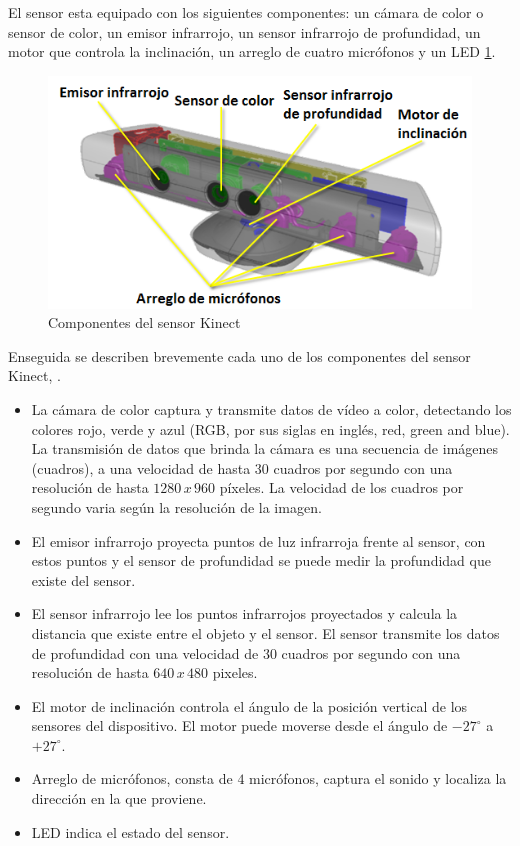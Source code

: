 El sensor esta equipado con los siguientes componentes: un cámara de color o sensor de color, un emisor infrarrojo, un sensor infrarrojo de profundidad, un motor que controla la inclinación, un arreglo de cuatro micrófonos y un LED \ref{fig:KinectComponentes}. 

\begin{figure}[!h]
\begin{center}
\includegraphics[scale=.6]{./Figures/sensor.png}
\end{center}
\caption{Componentes del sensor Kinect}
\label{fig:KinectComponentes}
\end{figure} 

Enseguida se describen brevemente cada uno de los componentes del sensor Kinect, \citep{Jana2013}. 
\begin{itemize}
\item La cámara de color captura y transmite datos de vídeo a color, detectando los colores rojo, verde y azul (RGB, por sus siglas en ingl\'es, red, green and blue). La transmisión de datos que brinda la cámara es una secuencia de imágenes (cuadros), a una velocidad de hasta $30$ cuadros por segundo con una resolución de hasta $1280\, x \, 960$ p\'ixeles. La velocidad de los cuadros por segundo varia según la resolución de la imagen.

\item El emisor infrarrojo proyecta puntos de luz infrarroja frente al sensor, con estos puntos y el sensor de profundidad se puede medir la profundidad que existe del sensor.

\item El sensor infrarrojo lee los puntos infrarrojos proyectados y calcula la distancia que existe entre el objeto y el sensor. El sensor transmite los datos de profundidad con una velocidad de $30$ cuadros por segundo con una resolución de hasta $640 \, x \, 480$ pixeles.   

\item El motor de inclinación controla el \'angulo de la posición vertical de los sensores del dispositivo. El motor puede moverse desde el \'angulo de $-27^ \circ$ a $+27^\circ$. 

\item Arreglo de micrófonos, consta de $4$ micrófonos, captura el sonido y localiza la dirección en la que proviene. 

\item LED indica el estado del sensor.
 
\end{itemize}


